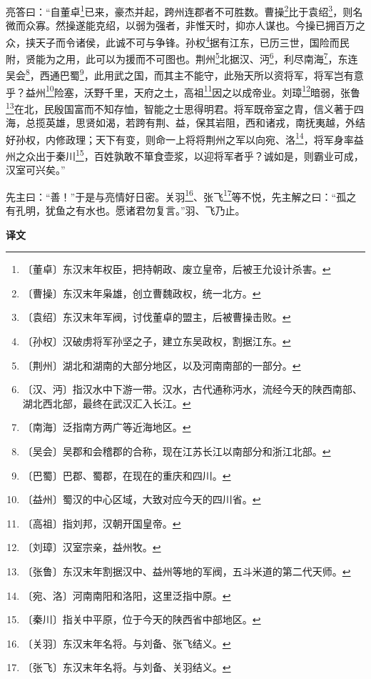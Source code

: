\documentclass[12pt,UTF-8,openany,a4]{ctexbook}
\begin{document}
\begin{large}
    亮答曰：“自董卓\footnote{〔董卓〕\yiwen 东汉末年权臣，把持朝政、废立皇帝，后被王允设计杀害。}已来，豪杰并起，跨州连郡者不可胜数。曹操\footnote{〔曹操〕\yiwen 东汉末年枭雄，创立曹魏政权，统一北方。}比于袁绍\footnote{〔袁绍〕\yiwen 东汉末年军阀，讨伐董卓的盟主，后被曹操击败。}，则名微而众寡。然操遂能克绍，以弱为强者，非惟天时，抑亦人谋也。今操已拥百万之众，挟天子而令诸侯，此诚不可与争锋。孙权\footnote{〔孙权〕\yiwen 汉破虏将军孙坚之子，建立东吴政权，割据江东。}据有江东，已历三世，国险而民附，贤能为之用，此可以为援而不可图也。荆州\footnote{〔荆州〕\yiwen 湖北和湖南的大部分地区，以及河南南部的一部分。}北据汉、沔\footnote{〔汉、沔〕\yiwen 指汉水中下游一带。汉水，古代通称沔水，流经今天的陕西南部、湖北西北部，最终在武汉汇入长江。}，利尽南海\footnote{〔南海〕\yiwen 泛指南方两广等近海地区。}，东连吴会\footnote{〔吴会〕\yiwen 吴郡和会稽郡的合称，现在江苏长江以南部分和浙江北部。}，西通巴蜀\footnote{〔巴蜀〕\yiwen 巴郡、蜀郡，在现在的重庆和四川。}，此用武之国，而其主不能守，此殆天所以资将军，将军岂有意乎？益州\footnote{〔益州〕\yiwen 蜀汉的中心区域，大致对应今天的四川省。}险塞，沃野千里，天府之土，高祖\footnote{〔高祖〕\yiwen 指刘邦，汉朝开国皇帝。}因之以成帝业。刘璋\footnote{〔刘璋〕\yiwen 汉室宗亲，益州牧。}暗弱，张鲁\footnote{〔张鲁〕\yiwen 东汉末年割据汉中、益州等地的军阀，五斗米道的第二代天师。}在北，民殷国富而不知存恤，智能之士思得明君。将军既帝室之胄，信义著于四海，总揽英雄，思贤如渴，若跨有荆、益，保其岩阻，西和诸戎，南抚夷越，外结好孙权，内修政理；天下有变，则命一上将将荆州之军以向宛、洛\footnote{〔宛、洛〕\yiwen 河南南阳和洛阳，这里泛指中原。}，将军身率益州之众出于秦川\footnote{〔秦川〕\yiwen 指关中平原，位于今天的陕西省中部地区。}，百姓孰敢不箪食壶浆，以迎将军者乎？诚如是，则霸业可成，汉室可兴矣。”
    
    先主曰：“善！”于是与亮情好日密。关羽\footnote{〔关羽〕\yiwen 东汉末年名将。与刘备、张飞结义。}、张飞\footnote{〔张飞〕\yiwen 东汉末年名将。与刘备、关羽结义。}等不悦，先主解之曰：“孤之有孔明，犹鱼之有水也。愿诸君勿复言。”羽、飞乃止。

\end{large}


\newpage

\begin{Large}
    \noindent\textbf{译文}
\end{Large}


\vspace{1em}
\end{document}
